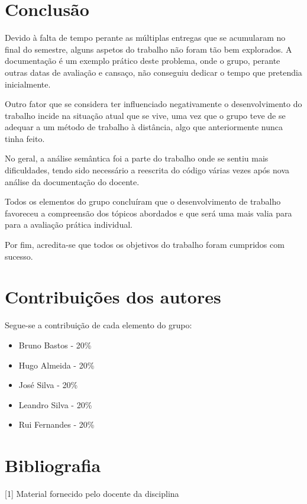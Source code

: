\documentclass[10pt,portuguese]{article}
\begin{document}
\clearpage

\section{Conclusão}

\par Devido à falta de tempo perante as múltiplas entregas que se acumularam no final do semestre, alguns aspetos do trabalho não foram tão bem explorados. A documentação é um exemplo prático deste problema, onde o grupo, perante outras datas de avaliação e cansaço, não conseguiu dedicar o tempo que pretendia inicialmente.

\par Outro fator que se considera ter influenciado negativamente o desenvolvimento do trabalho incide na situação atual que se vive, uma vez que o grupo teve de se adequar a um método de trabalho à distância, algo que anteriormente nunca tinha feito.

\par No geral, a análise semântica foi a parte do trabalho onde se sentiu mais dificuldades, tendo sido necessário a reescrita do código várias vezes após nova análise da documentação do docente.

\par Todos os elementos do grupo concluíram que o desenvolvimento de trabalho favoreceu a compreensão dos tópicos abordados e que será uma mais valia para para a avaliação prática individual.

\par Por fim, acredita-se que todos os objetivos do trabalho foram cumpridos com sucesso.

\section{Contribuições dos autores}
\par Segue-se a contribuição de cada elemento do grupo:
\begin{itemize}
    \item Bruno Bastos -  20\%
	\item Hugo Almeida - 20\%
	\item José Silva - 20\%
    \item Leandro Silva - 20\%
	\item Rui Fernandes - 20\%
\end{itemize}

\clearpage

\section{Bibliografia}





\vspace{5mm} %

[1] Material fornecido pelo docente da disciplina
\end{document}
